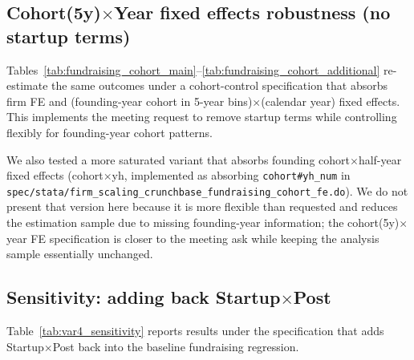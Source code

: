 \documentclass{article}
\newcommand{\cleanedresultsdir}{../results/cleaned/tex}
\begin{document}
\subsection*{Cohort(5y)$\times$Year fixed effects robustness (no startup terms)}
Tables~\ref{tab:fundraising_cohort_main}--\ref{tab:fundraising_cohort_additional} re-estimate the same outcomes under a cohort-control
specification that absorbs firm FE and (founding-year cohort in 5-year bins)$\times$(calendar year) fixed effects.
This implements the meeting request to remove startup terms while controlling flexibly for founding-year cohort patterns.
\par
We also tested a more saturated variant that absorbs founding cohort$\times$half-year fixed effects (cohort$\times$yh, implemented as
absorbing \texttt{cohort\#yh\_num} in \texttt{spec/stata/firm\_scaling\_crunchbase\_fundraising\_cohort\_fe.do}). We do not present that
version here because it is more flexible than requested and reduces the estimation sample due to missing founding-year information; the
cohort(5y)$\times$year FE specification is closer to the meeting ask while keeping the analysis sample essentially unchanged.

\begin{table}[H]
\caption{Fundraising outcomes (cohort(5y)$\times$year FE)}
\label{tab:fundraising_cohort_main}

\end{table}

\begin{table}[H]
\caption{Additional fundraising outcomes (cohort(5y)$\times$year FE)}
\label{tab:fundraising_cohort_additional}

\end{table}

\subsection*{Sensitivity: adding back Startup$\times$Post}
Table~\ref{tab:var4_sensitivity} reports results under the specification that adds Startup$\times$Post back into the baseline
fundraising regression.
\begin{table}[H]
\caption{Sensitivity: adding back Startup$\times$Post}
\label{tab:var4_sensitivity}

\end{table}
\end{document}
